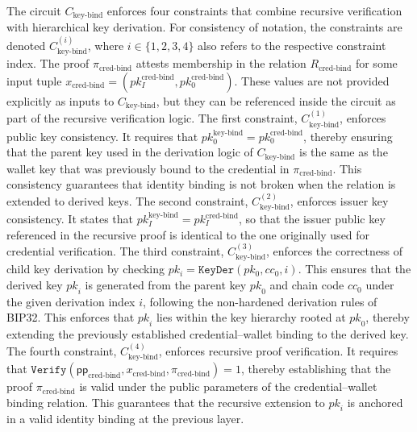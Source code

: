 \medskip
The circuit $C_{\text{key-bind}}$ enforces four constraints that combine recursive verification with hierarchical key derivation. For consistency of notation, the constraints are denoted $C_{\text{key-bind}}^{(i)}$, where $i \in \{1,2,3,4\}$ also refers to the respective constraint index. The proof $\pi_{\text{cred-bind}}$ attests membership in the relation $R_{\text{cred-bind}}$ for some input tuple $x_{\text{cred-bind}} = (pk_I^{\text{cred-bind}}, pk_0^{\text{cred-bind}})$. These values are not provided explicitly as inputs to $C_{\text{key-bind}}$, but they can be referenced inside the circuit as part of the recursive verification logic. The first constraint, $C_{\text{key-bind}}^{(1)}$, enforces public key consistency. It requires that  
$pk_0^{\text{key-bind}} = pk_0^{\text{cred-bind}}$, thereby ensuring that the parent key used in the derivation logic of $C_{\text{key-bind}}$ is the same as the wallet key that was previously bound to the credential in $\pi_{\text{cred-bind}}$. This consistency guarantees that identity binding is not broken when the relation is extended to derived keys. The second constraint, $C_{\text{key-bind}}^{(2)}$, enforces issuer key consistency. It states that $pk_I^{\text{key-bind}} = pk_I^{\text{cred-bind}}$, so that the issuer public key referenced in the recursive proof is identical to the one originally used for credential verification. The third constraint, $C_{\text{key-bind}}^{(3)}$, enforces the correctness of child key derivation by checking $pk_i = \texttt{KeyDer}(pk_0, cc_0, i)$. This ensures that the derived key $\mathit{pk}_i$ is generated from the parent key $\mathit{pk}_0$ and chain code $\mathit{cc}_0$ under the given derivation index $\mathit{i}$, following the non-hardened derivation rules of BIP32. This enforces that $\mathit{pk}_i$ lies within the key hierarchy rooted at $\mathit{pk}_0$, thereby extending the previously established credential–wallet binding to the derived key. The fourth constraint, $C_{\text{key-bind}}^{(4)}$, enforces recursive proof verification. It requires that  
$\texttt{Verify}(\mathsf{pp}_{\text{cred-bind}}, x_{\text{cred-bind}}, \pi_{\text{cred-bind}}) = 1$, thereby establishing that the proof $\pi_{\text{cred-bind}}$ is valid under the public parameters of the credential–wallet binding relation. This guarantees that the recursive extension to $\mathit{pk}_i$ is anchored in a valid identity binding at the previous layer.

